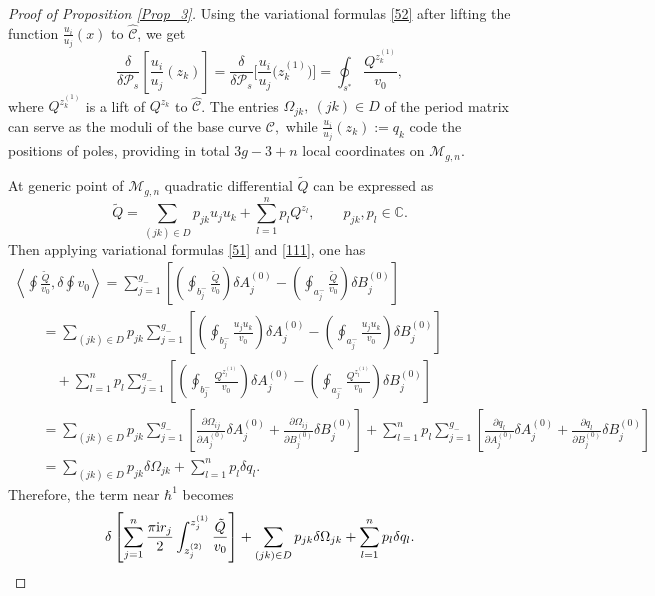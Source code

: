 \documentclass[pdftex]{sigma}
\numberwithin{equation}{section}
\theoremstyle{definition}
\newcommand{\CC}{\mathbb{C}}
\begin{document}
\begin{proof}[Proof of Proposition \ref{Prop_3}]
Using the variational formulas \eqref{52} after lifting the function $\frac{u_i}{u_j}(x)$ to $\hat{\mathcal{C}}$, we get
\begin{equation}\label{111}
\frac{\delta }{\delta \mathcal{P}_s}\left[\frac{u_i}{u_j}(z_k)\right]=\frac{\delta }{\delta \mathcal{P}_s}\Bigg[\frac{u_i}{u_j}\big(z^{(1)}_k\big)\Bigg]=\oint_{s^*}\frac{Q^{z^{(1)}_k}}{v_0},
\end{equation}
where $Q^{z^{(1)}_k}$ is a lift of $Q^{z_k}$ to $\hat{\mathcal{C}}$. The entries $\Omega_{jk}, \ (jk) \in D$ of the period matrix can serve as the moduli of the base curve $\mathcal{C},$ while $\frac{u_i}{u_j}(z_k):=q_k$ code the positions of poles, providing in total $3g-3+n$ local coordinates on $\mathcal{M}_{g,n}.$

At generic point of $\mathcal{M}_{g,n}$ quadratic differential $\tilde{Q}$ can be expressed as
\begin{equation*}%
\tilde{Q}=\sum_{(jk) \in D}p_{jk} u_j u_k+ \sum^n_{l=1} p_l Q^{z_l}, \qquad p_{jk}, p_l \in \CC.\end{equation*}
Then applying variational formulas \eqref{51} and \eqref{111}, one has
\begin{gather}
\left\langle \oint \frac{\tilde{Q}}{v_0}, \delta \oint v_0\right\rangle =\sum^{g_-}_{j=1} \left[ \left(\oint_{b^-_j}\frac{\tilde{Q}}{v_0} \right)\delta A^{(0)}_j - \left(\oint_{a^-_j}\frac{\tilde{Q}}{v_0} \right)\delta B^{(0)}_j \right] \nonumber\\
\qquad{}
 =\sum_{(jk) \in D}p_{jk}\sum^{g_-}_{j=1} \left[ \left(\oint_{b^-_j}\frac{u_j u_k}{v_0} \right)
 \delta A^{(0)}_j - \left(\oint_{a^-_j}\frac{u_j u_k}{v_0} \right)\delta B^{(0)}_j \right ]\nonumber\\
 \qquad\quad{} + \sum^n_{l=1} p_l \sum^{g_-}_{j=1} \left[ \left(\oint_{b^-_j}\frac{Q^{z^{(1)}_l}}{v_0} \right)\delta A^{(0)}_j
 - \left(\oint_{a^-_j}\frac{Q^{z^{(1)}_l}}{v_0} \right)\delta B^{(0)}_j \right ]\nonumber\\
\qquad{}
=\sum_{(jk) \in D}\!p_{jk}\sum^{g_-}_{j=1} \!\left[ \frac{\partial \Omega_{ij}}{\partial A^{(0)}_j} \delta A^{(0)}_j +\frac{\partial \Omega_{ij}}{\partial B^{(0)}_j}\delta B^{(0)}_j \right]+\sum^n_{l=1} p_l \sum^{g_-}_{j=1} \!\left[ \frac{\partial q_l}{\partial A^{(0)}_j}\delta A^{(0)}_j + \frac{\partial q_l}{\partial B^{(0)}_j}\delta B^{(0)}_j \right ]
\nonumber\\
\qquad{}
=\sum_{(jk) \in D}p_{jk} \delta \Omega_{jk}+ \sum^n_{l=1} p_l \delta q_l. \label{114}
\end{gather}
Therefore, the term near $\hbar^1$ becomes
\begin{equation}\label{115}\delta\left[\sum^n_{j=1}\frac{\pi {\rm i} r_j}{2}
\int^{z^{(1)}_j}_{z^{(2)}_j}\frac{\tilde{Q}}{v_0} \right]+\sum_{(jk) \in D}p_{jk} \delta \Omega_{jk}+ \sum^n_{l=1} p_l \delta q_l.\end{equation}


\end{proof}
\end{document}
